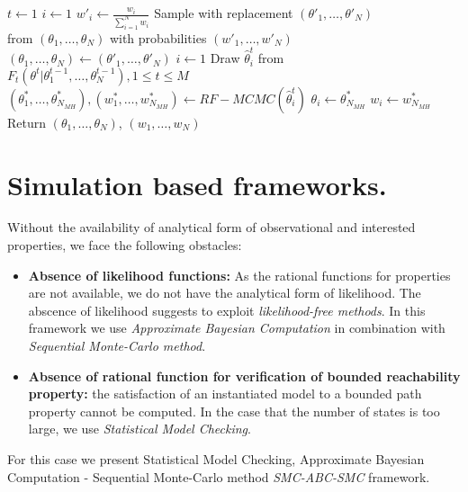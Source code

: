 \begin{algorithm}
      \begin{algorithmic}[H]
            \State $t \leftarrow 1$
            \State $i \leftarrow 1$ 
            \State $w'_i \leftarrow \frac{w_i}{\sum_{i=1}^N w_i} $
            \EndWhile
            \State Sample with replacement $(\theta'_1,\ldots,\theta'_N)$  \\\hspace{1.5cm} from $(\theta_1,\ldots,\theta_N)$ with probabilities $(w'_1,\ldots,w'_N)$
            \State $(\theta_1,\ldots,\theta_N) \leftarrow (\theta'_1,\ldots,\theta'_N)$
            \State $i \leftarrow 1$
             
            \State Draw $\hat{\theta}^t_i$ from $F_t(\theta^t | \theta^{t-1}_1,\ldots,\theta^{t-1}_N), 1\leq t \leq M$
            \State $(\theta^*_1,\ldots,\theta^*_{N_{MH}}), (w^*_1,\ldots,w^*_{N_{MH}}) \leftarrow RF-MCMC(\hat{\theta}^t_i)$
            \State $\theta_i \leftarrow \theta^*_{N_{MH}}$
            \State $w_i \leftarrow w^*_{N_{MH}}$
            \EndWhile
            \EndWhile
            \State Return $(\theta_1,\ldots,\theta_{N})$, $(w_1,\ldots,w_{N})$
            \EndProcedure
      \end{algorithmic}
\end{algorithm}

\section{Simulation based frameworks.}
Without the availability of analytical form of observational and interested properties, we face the
following obstacles:
\begin{itemize}
      \item \textbf{Absence of likelihood functions:} As the rational functions for properties are
            not available, we do not have the analytical form of likelihood. The abscence of
            likelihood suggests to exploit \textit{likelihood-free methods}. In this framework we
            use \textit{Approximate Bayesian Computation} in combination with \textit{Sequential
                  Monte-Carlo method}.
      \item \textbf{Absence of rational function for verification of bounded reachability property:}
            the satisfaction of an instantiated model to a bounded path property cannot be computed.
            In the case that the number of states is too large, we use \textit{Statistical Model
                  Checking}.
\end{itemize}
For this case we present Statistical Model Checking, Approximate Bayesian Computation - Sequential
Monte-Carlo method \textit{SMC-ABC-SMC} framework.

